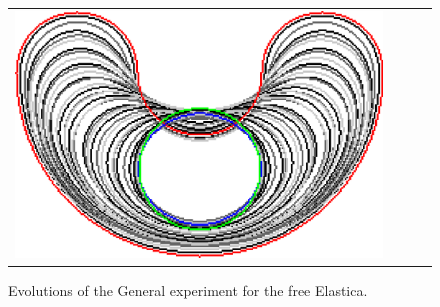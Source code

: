 \begin{figure}
\begin{tabular}{cccc}
\includegraphics[scale=0.2]{figures/chapter9/free-elastica/graphflow/bean/len_pen-0.01/radius-7/summary.pdf} 
\end{tabular}
\caption{Evolutions of the General experiment for the free Elastica.}
\label{fig:results-free-elastica-general}
\end{figure}

